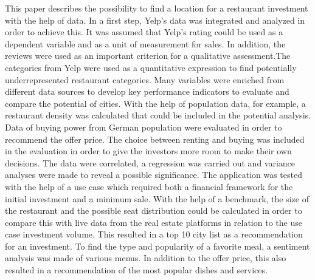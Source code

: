 This paper describes the possibility to find a location for a restaurant investment with the help of data. 
In a first step, Yelp's data was integrated and analyzed in order to achieve this. It was assumed that Yelp's rating could be used as a dependent variable and as a unit of measurement for sales. In addition, the reviews were used as an important criterion for a qualitative assessment.The categories from Yelp were used as a quantitative expression to find potentially underrepresented restaurant categories. \newline
Many variables were enriched from different data sources to develop key performance indicators to evaluate and compare the potential of cities. \newline 
With the help of population data, for example, a restaurant density was calculated that could be included in the potential analysis.
Data of buying power from German population were evaluated in order to recommend the offer price.
The choice between renting and buying was included in the evaluation in order to give the investors more room to make their own decisions. \newline 
The data were correlated, a regression was carried out and variance analyses were made to reveal a possible significance. 
The application was tested with the help of a use case which required both a financial framework for the initial investment and a minimum sale.  \newline
With the help of a benchmark, the size of the restaurant and the possible seat distribution could be calculated in order to compare this with live data from the real estate platforms in relation to the use case investment volume.
This resulted in a top 10 city list as a recommendation for an investment. 
To find the type and popularity of a favorite meal, a sentiment analysis was made of various menus. In addition to the offer price, this also resulted in a recommendation of the most popular dishes and services. 


